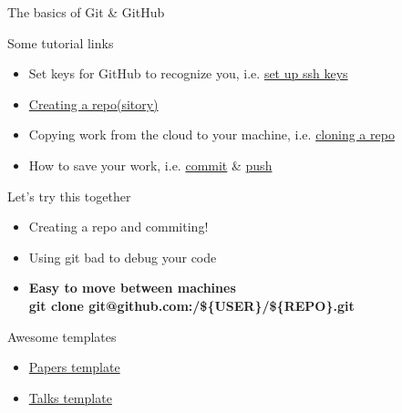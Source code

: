 \documentclass[aspectratio=169]{beamer}
\begin{document}
\begin{frame}{The basics of Git \& GitHub}

    \centering
    \vspace{-0.25\baselineskip}

    \begin{block}{Some tutorial links}
      \begin{itemize} 
      \item Set keys for GitHub to recognize you, i.e. \href{https://docs.github.com/en/authentication/connecting-to-github-with-ssh}{set up ssh keys}
      \item \href{https://docs.github.com/en/get-started/quickstart/create-a-repo}{Creating a repo(sitory)}
      \item Copying work from the cloud to your machine, i.e. \href{https://docs.github.com/en/repositories/creating-and-managing-repositories/cloning-a-repository}{cloning a repo}
      \item How to save your work, i.e. \href{https://github.com/git-guides/git-commit}{commit} \& \href{https://github.com/git-guides/git-push}{push}
    \end{itemize}
    \end{block}

    \begin{block}{Let's try this together}
      \begin{itemize} 
      \item Creating a repo and commiting!
      \item Using git bad to debug your code
      \item \bf{Easy to move between machines}\\git clone git@github.com:/\$\{USER\}/\$\{REPO\}.git
    \end{itemize}
    \end{block}

    \begin{block}{Awesome templates}
      \begin{itemize} 
      \item \href{https://github.com/tree-group-papers/PaperTemplate}{Papers template}
      \item \href{https://github.com/tree-group-other/TalkTemplate}{Talks template}
    \end{itemize}
    \end{block}

\end{frame}
\end{document}
